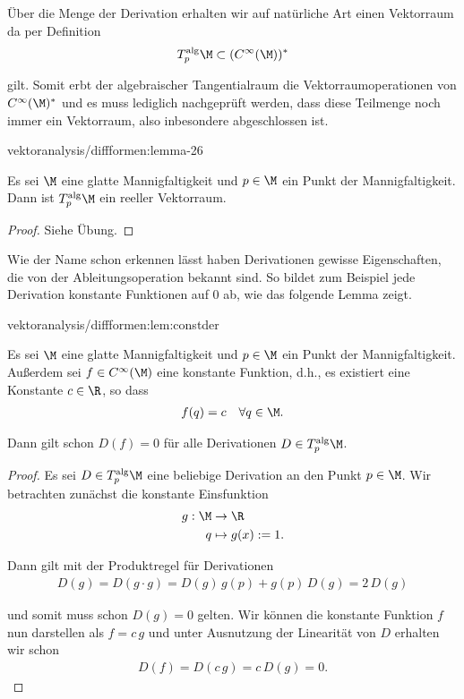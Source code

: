 \documentclass[letterpaper,10pt,english]{jupyterBook}
\begin{document}
\par
Über die Menge der Derivation erhalten wir auf natürliche Art einen Vektorraum da per Definition
\begin{align*}
T^{\text{alg}}_p\M \subset (C^\infty(\M))^\ast
\end{align*}
\par
gilt.
Somit erbt der algebraischer Tangentialraum die Vektorraumoperationen von \(C^\infty(\M)^\ast\) und es muss lediglich nachgeprüft werden, dass diese Teilmenge noch immer ein Vektorraum, also inbesondere abgeschlossen ist.
\begin{lemma}{}{vektoranalysis/diffformen:lemma-26}



\par
Es sei \(\M\) eine glatte Mannigfaltigkeit und \(p\in\M\) ein Punkt der Mannigfaltigkeit.
Dann ist \(T^{\text{alg}}_p\M\) ein reeller Vektorraum.
\end{lemma}

\begin{proof}
 Siehe Übung.
\end{proof}

\par
Wie der Name schon erkennen lässt haben Derivationen gewisse Eigenschaften, die von der Ableitungsoperation bekannt sind.
So bildet zum Beispiel jede Derivation konstante Funktionen auf \(0\) ab, wie das folgende Lemma zeigt.
\begin{lemma}{}{vektoranalysis/diffformen:lem:constder}



\par
Es sei \(\M\) eine glatte Mannigfaltigkeit und \(p\in\M\) ein Punkt der Mannigfaltigkeit.
Außerdem sei \(f\in C^\infty(\M)\) eine konstante Funktion, d.h., es existiert eine Konstante \(c\in\R\), so dass
\begin{align*}
f(q) = c\quad\forall q\in\M.
\end{align*}
\par
Dann gilt schon \(D(f)=0\) für alle Derivationen \(D\in T^{\text{alg}}_p\M\).
\end{lemma}

\begin{proof}
 Es sei \(D\in T^{\text{alg}}_p\M\) eine beliebige Derivation an den Punkt \(p \in \M\).
Wir betrachten zunächst die konstante Einsfunktion
\begin{align*}
g:\M &\to \R\\
q &\mapsto g(x) := 1.
\end{align*}
\par
Dann gilt mit der Produktregel für Derivationen
\begin{align*}
D(g) = D(g\cdot g) = D(g)\,g(p) + g(p)\, D(g) = 2\,D(g)
\end{align*}
\par
und somit muss schon \(D(g) = 0\) gelten.
Wir können die konstante Funktion \(f\) nun darstellen als \(f= c\,g\) und unter Ausnutzung der Linearität von \(D\) erhalten wir schon
\begin{align*}
D(f) = D(c\,g) = c\,D(g) = 0.
\end{align*}\end{proof}
\end{document}
